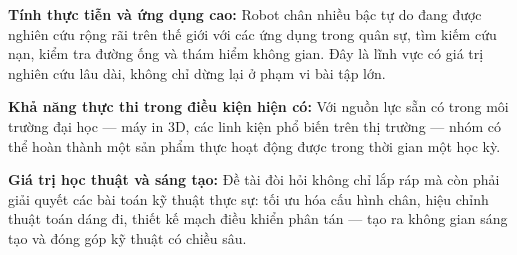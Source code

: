 \textbf{Tính thực tiễn và ứng dụng cao:} Robot chân nhiều bậc tự do đang được nghiên cứu rộng rãi trên thế giới với các ứng dụng trong quân sự, tìm kiếm cứu nạn, kiểm tra đường ống và thám hiểm không gian. Đây là lĩnh vực có giá trị nghiên cứu lâu dài, không chỉ dừng lại ở phạm vi bài tập lớn.

\textbf{Khả năng thực thi trong điều kiện hiện có:} Với nguồn lực sẵn có trong môi trường đại học — máy in 3D, các linh kiện phổ biến trên thị trường — nhóm có thể hoàn thành một sản phẩm thực hoạt động được trong thời gian một học kỳ.

\textbf{Giá trị học thuật và sáng tạo:} Đề tài đòi hỏi không chỉ lắp ráp mà còn phải giải quyết các bài toán kỹ thuật thực sự: tối ưu hóa cấu hình chân, hiệu chỉnh thuật toán dáng đi, thiết kế mạch điều khiển phân tán — tạo ra không gian sáng tạo và đóng góp kỹ thuật có chiều sâu.


                